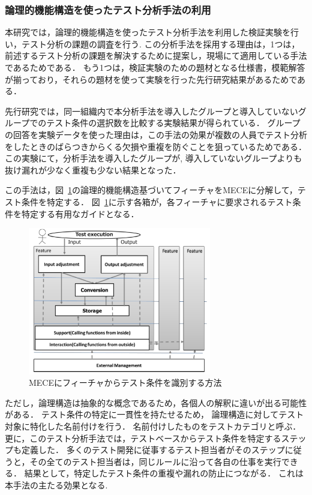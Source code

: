 \documentclass[10pt,a4j]{jarticle}
\begin{document}
\subsubsection{論理的機能構造を使ったテスト分析手法の利用}
本研究では，論理的機能構造を使ったテスト分析手法を利用した検証実験を行い，テスト分析の課題の調査を行う\cite{yumoto2013test}.
この分析手法を採用する理由は，1つは，前述するテスト分析の課題を解決するために提案し，現場にて適用している手法であるためである．
もう1つは，検証実験のための題材となる仕様書，模範解答が揃っており，それらの題材を使って実験を行った先行研究結果があるためである．

先行研究では，同一組織内で本分析手法を導入したグループと導入していないグループでのテスト条件の選択数を比較する実験結果が得られている．
グループの回答を実験データを使った理由は，この手法の効果が複数の人員でテスト分析をしたときのばらつきからくる欠損や重複を防ぐことを狙っているためである．
この実験にて，分析手法を導入したグループが, 導入していないグループよりも抜け漏れが少なく重複も少ない結果となった．

この手法は，図~\ref{fig:D-3-Fig3}の論理的機能構造基づいてフィーチャをMECEに分解して，テスト条件を特定する．
図~\ref{fig:D-3-Fig3}に示す各箱が，各フィーチャに要求されるテスト条件を特定する有用なガイドとなる．

\begin{figure}[h]
  \begin{center}
	\includegraphics[width=8cm]{./image/D-3-Fig3.png}
	\caption{MECEにフィーチャからテスト条件を識別する方法}
	\label{fig:D-3-Fig3}
  \end{center}
\end{figure}

ただし，論理構造は抽象的な概念であるため，各個人の解釈に違いが出る可能性がある．
テスト条件の特定に一貫性を持たせるため， 論理構造に対してテスト対象に特化した名前付けを行う．
名前付けしたものをテストカテゴリと呼ぶ．
更に，このテスト分析手法では，テストベースからテスト条件を特定するステップも定義した．
多くのテスト開発に従事するテスト担当者がそのステップに従うと，その全てのテスト担当者は，同じルールに沿って各自の仕事を実行できる．
結果として，特定したテスト条件の重複や漏れの防止につながる．
これは本手法の主たる効果となる.
\end{document}
